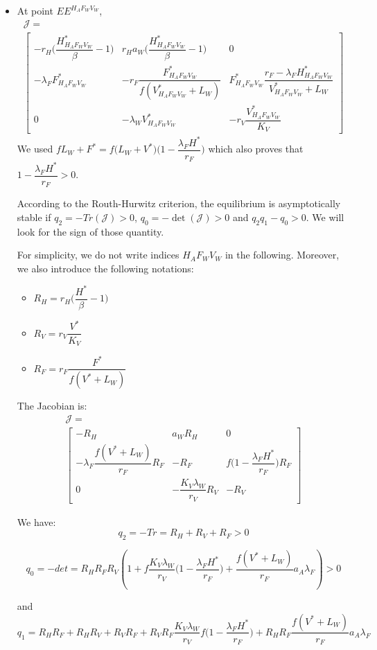 \documentclass{article}
\newcommand{\lfw}{\lambda_{F}}
\newcommand{\lfv}{\lambda_{W}}
\begin{document}
\begin{itemize}
\item At point $EE^{H_AF_WV_W}$, 
\begin{multline}
\mathcal{J} = \\
\begin{bmatrix}
-r_H \Big(\dfrac{H^*_{H_AF_WV_W}}{\beta}-1\Big) & r_H a_W \Big(\dfrac{H^*_{H_AF_WV_W}}{\beta}-1\Big) & 0 \\
-\lfw F^*_{H_AF_WV_W} & -r_F \dfrac{F^*_{H_AF_WV_W}}{f(V^*_{H_AF_WV_W} + L_W)} &
F^*_{H_AF_WV_W} \dfrac{r_F- \lfw H^*_{H_AF_WV_W}}{V^*_{H_AF_WV_W} + L_W}\\
0 & -\lfv V^*_{H_AF_WV_W} & -r_V \dfrac{V^*_{H_AF_WV_W}}{K_V} 
\end{bmatrix}
\end{multline}
We used $f L_W + F^* = f\Big( L_W + V^* \Big) \Big(1 - \dfrac{\lfw H^*}{r_F} \Big)$ which also proves that $1 - \dfrac{\lfw H^*}{r_F} > 0$.

According to the Routh-Hurwitz criterion, the equilibrium is asymptotically stable if $q_2 = - Tr(\mathcal{J}) > 0$, $q_0 = -\det(\mathcal{J}) > 0$ and $q_2 q_1 - q_0 > 0$. We will look for the sign of those quantity.

For simplicity, we do not write indices ${H_AF_WV_W}$ in the following. Moreover, we also introduce the following notations:
\begin{itemize}
\item $R_H = r_H \Big(\dfrac{H^*}{\beta} -1 \Big) $
\item $R_V = r_V \dfrac{V^*}{K_V}$
\item $R_F = r_F \dfrac{F^*}{f(V^* + L_W)}$
\end{itemize}
The Jacobian is:
\begin{multline}
\mathcal{J} = \\
\begin{bmatrix}
-R_H & a_W R_H & 0 \\
-\lfw \dfrac{f(V^* + L_W)}{r_F}R_F & -R_F &
 f \Big(1 - \dfrac{\lfw H^*}{r_F} \Big)R_F\\
0 & -\dfrac{K_V \lfv}{r_V} R_V & -R_V
\end{bmatrix}
\end{multline}

We have:
$$
q_2 = -Tr = R_H + R_V + R_F  > 0
$$

$$
q_0 = - det = R_HR_FR_V \left(1 + f \dfrac{K_V \lfv}{r_V} \Big(1 - \dfrac{\lfw H^*}{r_F}\Big) + \dfrac{f(V^* + L_W)}{r_F}a_A \lfw \right) > 0
$$

and
$$
q_1 = R_H R_F + R_H R_V + R_V R_F + R_VR_F \dfrac{K_V\lfv}{r_V}f\Big(1 - \dfrac{\lfw H^*}{r_F}\Big) + R_H R_F \dfrac{f(V^* + L_W)}{r_F}a_A \lfw
$$


\end{itemize}
\end{document}
